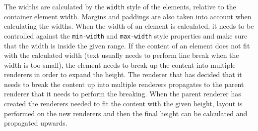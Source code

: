 \documentclass[a4paper,11pt]{kth-mag}
\newcommand{\code}[1]{\texttt{#1}}
\begin{document}
        The widths are calculated by the \code{width} style of the \glspl{element}, relative to the container \gls{element} width.
        Margins and paddings are also taken into account when calculating the widths.
        When the width of an \gls{element} is calculated, it needs to be controlled against the \code{min-width} and \code{max-width} style properties and make sure that the width is inside the given range.
        If the content of an \gls{element} does not fit with the calculated width (text usually needs to perform line break when the width is too small), the \gls{element} needs to break up the content into multiple renderers in order to expand the height.
        The renderer that has decided that it needs to break the content up into multiple renderers propagates to the parent renderer that it needs to perform the breaking.
        When the parent renderer has created the renderers needed to fit the content with the given height, layout is performed on the new renderers and then the final height can be calculated and propagated upwards.
      
\end{document}
